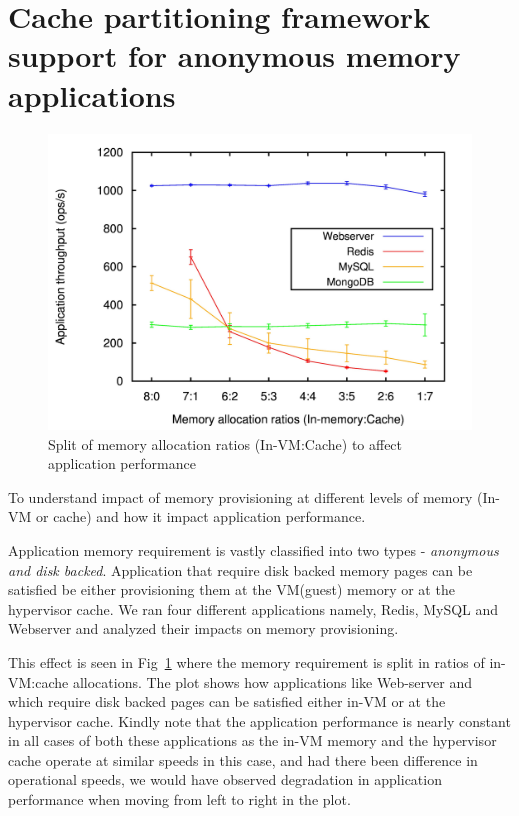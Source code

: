     
    \section{Cache partitioning framework support for anonymous memory applications} 
	
	\begin{figure}
	  \centering
	  \includegraphics[scale=0.09]{images/dd_decentrailze_motivation/throughput.jpg}
	  \caption{Split of memory allocation ratios (In-VM:Cache) to affect application performance}
	  \label{plot:dd_decentrailze_motivation}
	\end{figure}
	
	  To understand impact of memory provisioning at different levels of memory (In-VM or cache)
	  and how it impact application performance.
	
	  Application memory requirement is vastly classified into two types - \textit{anonymous and disk backed}.
	  Application that require disk backed memory pages can be satisfied be either provisioning them at the 
	  VM(guest) memory or at the hypervisor cache. We ran four different applications namely, Redis, \mongo{}
	  MySQL and Webserver and analyzed their impacts on memory provisioning.
	  
	  This effect is seen in Fig~\ref{plot:dd_decentrailze_motivation}
	  where the memory requirement is split in ratios of in-VM:cache allocations. The plot shows how applications like
	  Web-server and \mongo{} which require disk backed pages can be satisfied either in-VM or at the hypervisor cache.
	  Kindly note that the application performance is nearly constant in all cases of both these applications as the 
	  in-VM memory and the hypervisor cache operate at similar speeds in this case, and had there been difference in
	  operational speeds, we would have observed degradation in application performance when moving from left to right 
	  in the plot.
	
